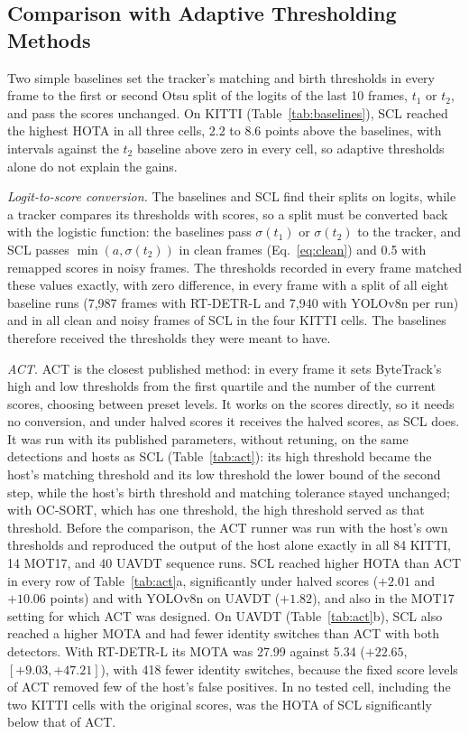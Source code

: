 \documentclass[pdflatex,sn-mathphys-num,iicol]{sn-jnl}
\newcommand{\scl}{SCL}
\begin{document}
\subsection{Comparison with Adaptive Thresholding Methods}\label{sec:baselines}
Two simple baselines set the tracker's matching and birth thresholds in every frame to the first or
second Otsu split of the logits of the last 10 frames, $t_1$ or $t_2$, and pass the scores
unchanged. On KITTI (Table~\ref{tab:baselines}), \scl{} reached the highest HOTA in all three
cells, 2.2 to 8.6 points above the baselines, with intervals against the $t_2$ baseline above zero
in every cell, so adaptive thresholds alone do not explain the gains.

\emph{Logit-to-score conversion.} The baselines and \scl{} find their splits on logits, while a
tracker compares its thresholds with scores, so a split must be converted back with the logistic
function: the baselines pass $\sigma(t_1)$ or $\sigma(t_2)$ to the tracker, and \scl{} passes
$\min(a,\sigma(t_2))$ in clean frames (Eq.~\eqref{eq:clean}) and 0.5 with remapped scores in noisy
frames. The thresholds recorded in every frame matched these values exactly, with zero difference,
in every frame with a split of all eight baseline runs (7,987 frames with RT-DETR-L and 7,940
with YOLOv8n per run) and in all clean and noisy frames of \scl{} in the four KITTI cells. The baselines therefore received the thresholds they were meant to have.

\emph{ACT.} ACT \cite{act2026adaptive} is the closest published method: in every frame it sets
ByteTrack's high and low thresholds from the first quartile and the number of the current scores,
choosing between preset levels. It works on the scores directly, so it needs no conversion, and
under halved scores it receives the halved scores, as \scl{} does. It was run with its published
parameters, without retuning, on the same detections and hosts as \scl{} (Table~\ref{tab:act}):
its high threshold became the host's matching threshold and its low threshold the lower bound of
the second step, while the host's birth threshold and matching tolerance stayed unchanged; with
OC-SORT, which has one threshold, the high threshold served as that threshold. Before the
comparison, the ACT runner was run with the host's own thresholds and reproduced the output of the
host alone exactly in all 84 KITTI, 14 MOT17, and 40 UAVDT sequence runs. \scl{} reached higher HOTA
than ACT in every row of Table~\ref{tab:act}a, significantly under halved
scores ($+2.01$ and $+10.06$ points) and with YOLOv8n on UAVDT ($+1.82$), and also in the MOT17
setting for which ACT was designed. On UAVDT (Table~\ref{tab:act}b), \scl{} also reached a higher
MOTA and had fewer identity switches than ACT with both detectors. With RT-DETR-L its MOTA was 27.99
against 5.34 ($+22.65$, $[+9.03,+47.21]$), with 418 fewer identity switches, because the fixed score
levels of ACT removed few of the host's false positives. In no tested cell, including the two KITTI cells with the
original scores, was the HOTA of \scl{} significantly below that of ACT.
\end{document}

